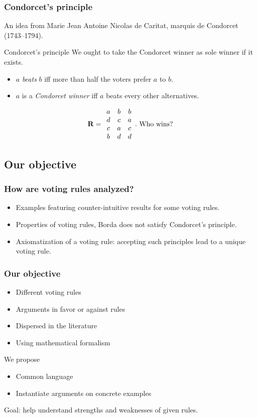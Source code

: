 \documentclass[english]{beamer}
\begin{document}
\begin{frame}
	\frametitle{Condorcet’s principle}
	
	An idea from Marie Jean Antoine Nicolas de Caritat, marquis de Condorcet (1743–1794).
	\begin{block}{Condorcet’s principle}
		We ought to take the Condorcet winner as sole winner if it exists.
		\begin{itemize}
			\item $a$ \emph{beats} $b$ iff more than half the voters prefer $a$ to $b$.
			\item $a$ is a \emph{Condorcet winner} iff $a$ beats every other alternatives.
		\end{itemize}
	\end{block}
	\vfill
	\begin{equation}
		\mathbf{R} =
		\begin{array}{ccc}
			a	&	b	&	b\\
			d	&	c	&	a\\
			c	&	a	&	c\\
			b	&	d	&	d
		\end{array}.\text{ Who wins?}
	\end{equation}
\end{frame}

\subsection{Our objective}
\begin{frame}
	\frametitle{How are voting rules analyzed?}
	
	\begin{itemize}
		\item Examples featuring counter-intuitive results for some voting rules.
		\item Properties of voting rules, \eg Borda does not satisfy Condorcet’s principle.
		\item Axiomatization of a voting rule: accepting such principles lead to a unique voting rule.
	\end{itemize}
\end{frame}

\begin{frame}
	\frametitle{Our objective}
	
	\begin{itemize}
		\item Different voting rules
		\item Arguments in favor or against rules
		\item Dispersed in the literature
		\item Using mathematical formalism
	\end{itemize}
	\begin{block}{We propose}
		\begin{itemize}
			\item Common language
			\item Instantiate arguments on concrete examples
		\end{itemize}
	\end{block}
	Goal: help understand strengths and weaknesses of given rules.
\end{frame}
\end{document}
